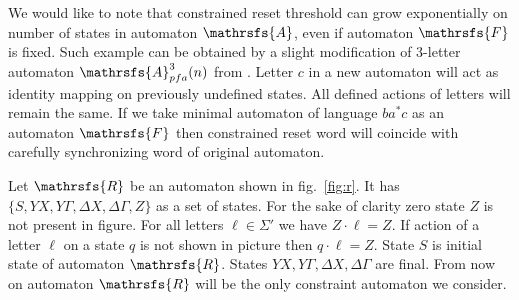 \documentclass[11pt]{llncs}
\newcommand{\A}{\mathrsfs{A}}
\newcommand{\R}{\mathrsfs{R}}
\newcommand{\G}{\Gamma}
\newcommand{\D}{\Delta}
\newcommand{\rtc}{\mathrm{rt}_{c}}
\begin{document}
We would like to note that constrained reset threshold can grow exponentially on number of states in automaton $\A$, even
if automaton $\mathrsfs{F}$ is fixed. Such example can be obtained by a slight modification of 3-letter automaton $\mathrsfs{A}^3_{pfa}(n)$
from \cite{Mart}. Letter $c$ in a new automaton will act as identity mapping on previously undefined states. All defined actions
of letters will remain the same. %
If we take minimal automaton of language $ba^*c$ as an automaton $\mathrsfs{F}$ then constrained reset word will coincide 
with carefully synchronizing word of original automaton.


Let $\R$ be an automaton shown in fig.~\ref{fig:r}. It has $\{S, YX, Y\G , \D X, \D \G, Z\}$ as a set of states.
For the sake of clarity zero state $Z$ is not present in figure. For all letters $\ell \in \Sigma'$ we have 
$Z \cdot \ell = Z$. If action of a letter $\ell$ on a state $q$ is not shown in picture then $q \cdot \ell = Z$.
State $S$ is initial state of automaton $\R$. States $YX, Y\G , \D X, \D \G$ are final. From now on automaton $\R$
will be the only constraint automaton we consider.
\end{document}
